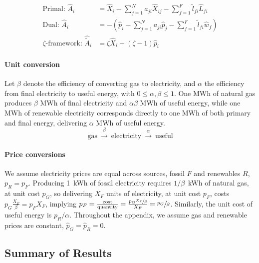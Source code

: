 \documentclass[11pt]{article}
\begin{document}
\begin{subequations}
\begin{align}
\text{Primal: }\hat{A}_i  &=  
\hat{X}_i  -  \sum_{j=1}^N a_{ji} \hat{X}_{ij}  -  \sum_{f=1}^F \tilde{l}_{fi} \hat{L}_{fi}
\label{eq:primal_appendix} \\
\text{Dual: }\hat{A}_i  &= 
-\left( \hat{p}_i  -  \sum_{j=1}^N a_{ji} \hat{p}_j  -  \sum_{f=1}^F \tilde{l}_{fi} \hat{w}_f \right)
\label{eq:dual_appendix} \\
\zeta\text{-framework: }\hat{\tilde{A}}_i &= 
\zeta \hat{X}_i+(\zeta-1)\hat{p}_i
\label{eq:zeta_framework}
\end{align}
\end{subequations}


\paragraph{Unit conversion} Let $\beta$ denote the efficiency of converting gas to electricity, and $\alpha$ the efficiency from final electricity to useful energy, with $0 \leq \alpha, \beta \leq 1$. One MWh of natural gas produces $\beta$ MWh of final electricity and $\alpha\beta$ MWh of useful energy, while one MWh of renewable electricity corresponds directly to one MWh of both primary and final energy, delivering $\alpha$ MWh of useful energy.
\[\text{gas}~ \xrightarrow{\beta}~ \text{electricity}~ \xrightarrow{\alpha} ~\text{useful}\]

\paragraph{Price conversions}
We assume electricity prices are equal across sources, fossil $F$ and renewables $R$, $p_R = p_F$. Producing 1~kWh of fossil electricity requires $1/\beta$~kWh of natural gas, at unit cost $p_G$, so delivering $X_F$ units  of electricity, at unit cost $p_F$, costs $p_G \frac{X_F}{\beta} = p_F X_F$, implying $p_F = \frac{\text{cost}}{\text{quantity}}=\frac{p_G \sfrac{X_F}{\beta}}{X_F} =\sfrac{p_G}{\beta}$. Similarly, the unit cost of useful energy is $p_R/\alpha$. Throughout the appendix, we assume gas and renewable prices are constant, $\hat{p}_G = \hat{p}_R = 0$.


\subsection{Summary of Results}
\end{document}
